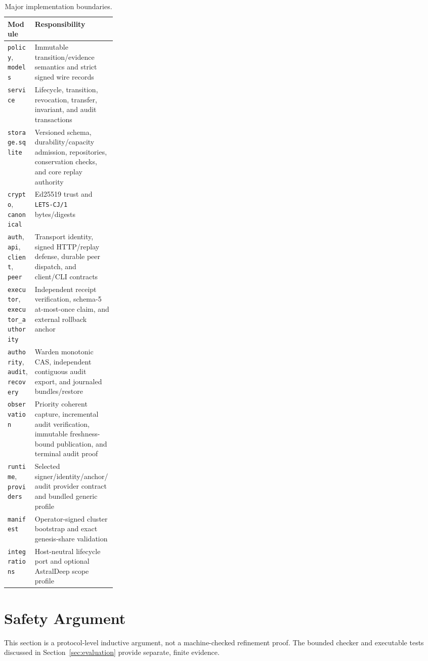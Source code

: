 \documentclass[10pt]{article}
\newcommand{\code}[1]{\nolinkurl{#1}}
\begin{document}
\begin{table}[ht]
\centering
\caption{Major implementation boundaries.}
\label{tab:modules}
\small
\begin{tabularx}{\linewidth}{@{}p{0.25\linewidth}X@{}}
\toprule
Module & Responsibility \\
\midrule
\code{policy}, \code{models} & Immutable transition/evidence semantics and strict signed wire records \\
\code{service} & Lifecycle, transition, revocation, transfer, invariant, and audit transactions \\
\code{storage.sqlite} & Versioned schema, durability/capacity admission, repositories, conservation checks, and core replay authority \\
\code{crypto}, \code{canonical} & Ed25519 trust and \code{LETS-CJ/1} bytes/digests \\
\code{auth}, \code{api}, \code{client}, \code{peer} & Transport identity, signed HTTP/replay defense, durable peer dispatch, and client/CLI contracts \\
\code{executor}, \code{executor_authority} & Independent receipt verification, schema-5 at-most-once claim, and external rollback anchor \\
\code{authority}, \code{audit}, \code{recovery} & Warden monotonic CAS, independent contiguous audit export, and journaled bundles/restore \\
\code{observation} & Priority coherent capture, incremental audit verification, immutable freshness-bound publication, and terminal audit proof \\
\code{runtime}, \code{providers} & Selected signer/identity/anchor/audit provider contract and bundled generic profile \\
\code{manifest} & Operator-signed cluster bootstrap and exact genesis-share validation \\
\code{integrations} & Host-neutral lifecycle port and optional AstralDeep scope profile \\
\bottomrule
\end{tabularx}
\end{table}

\section{Safety Argument}

This section is a protocol-level inductive argument, not a machine-checked refinement proof. The
bounded checker and executable tests discussed in Section~\ref{sec:evaluation} provide separate,
finite evidence.
\end{document}
